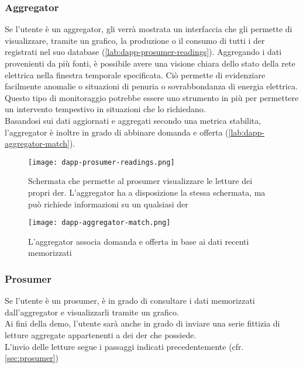 \subsubsection{Aggregator}
Se l'utente è un \gls{aggregator}, gli verrà mostrata un interfaccia che gli permette di visualizzare, tramite un grafico,
la produzione o il consumo di tutti i \gls{der} registrati nel suo database (\autoref{lab:dapp-prosumer-readings}).
Aggregando i dati provenienti da più fonti, è possibile avere una visione chiara dello stato della rete elettrica
nella finestra temporale specificata. Ciò permette di evidenziare facilmente anomalie o situazioni di penuria o sovrabbondanza
di energia elettrica. \\
Questo tipo di monitoraggio potrebbe essere uno strumento in più per permettere un intervento tempestivo in situazioni che lo richiedano. \\
Basandosi sui dati aggiornati e aggregati secondo una metrica stabilita, l'\gls{aggregator} è inoltre in grado di abbinare domanda e offerta (\autoref{lab:dapp-aggregator-match}). \\

\begin{figure}[H]
    \texttt{[image: dapp-prosumer-readings.png]}
    \centering
    \caption{Schermata che permette al \gls{prosumer} visualizzare le letture dei propri \gls{der}. L'\gls{aggregator} ha a disposizione la stessa schermata, ma può richiede informazioni su un qualsiasi \gls{der}}
    \label{lab:dapp-prosumer-readings}
\end{figure}

\begin{figure}[H]
    \texttt{[image: dapp-aggregator-match.png]}
    \centering
    \caption{L'\gls{aggregator} associa domanda e offerta in base ai dati recenti memorizzati}
    \label{lab:dapp-aggregator-match}
\end{figure}

\subsubsection{Prosumer}
Se l'utente è un \gls{prosumer}, è in grado di consultare i dati memorizzati dall'\gls{aggregator} e visualizzarli tramite un grafico. \\
Ai fini della demo, l'utente sarà anche in grado di inviare una serie fittizia di letture aggregate appartenenti a dei \gls{der} che possiede. \\
L'invio delle letture segue i passaggi indicati precedentemente (cfr. \autoref{sec:prosumer})

